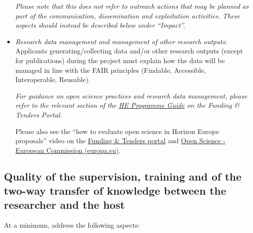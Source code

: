 \documentclass[11pt,draftproposal]{msca-pf}
\begin{document}
\begin{itemize}
    \emph{Please note that this does not refer to outreach actions that may be
    planned as part of the communication, dissemination and exploitation activities.
    These aspects should instead be described below under ``Impact''.}

    \item \emph{Research data management and management of other research outputs}:
    Applicants generating/collecting data and/or other research outputs (except for
    publications) during the project must explain how the data will be managed
    in line with the FAIR principles (Findable, Accessible, Interoperable,
    Reusable).

    \emph{For guidance on open science practices and research data management,
    please refer to the relevant section of the \href{https://ec.europa.eu/info/funding-tenders/opportunities/docs/2021-2027/horizon/guidance/programme-guide_horizon_en.pdf}{HE Programme Guide}
    on the Funding \& Tenders Portal.}

    Please also see the “how to evaluate open science in Horizon Europe proposals”
    video on the \href{https://ec.europa.eu/info/funding-tenders/opportunities/portal/screen/support/videos}{Funding \& Tenders portal} and
    \href{https://rea.ec.europa.eu/open-science_en}{Open Science - European Commission (europa.eu)}.
\end{itemize}

\subsection{Quality of the supervision, training and of the two-way transfer of
    knowledge between the researcher and the host}
\label{ssc:excellence:supervision}

At a minimum, address the following aspects:
\end{document}
